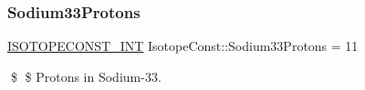 \subsubsection{\texorpdfstring{Sodium33\+Protons}{Sodium33Protons}}
{\footnotesize\ttfamily \mbox{\hyperlink{group___isotope_const-_macros_ga5f18360b3e99483a35c32d789e62621c}{I\+S\+O\+T\+O\+P\+E\+C\+O\+N\+S\+T\+\_\+\+I\+NT}} Isotope\+Const\+::\+Sodium33\+Protons = 11}

\$ \$ Protons in Sodium-\/33. 